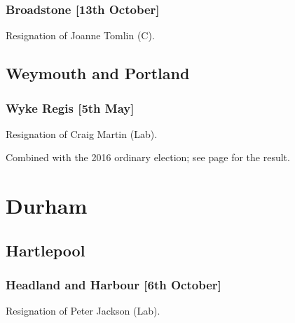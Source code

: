 \documentclass[a4paper,openany]{book}
\begin{document}
\begin{resultsiii}
\subsubsection*{Broadstone \hspace*{\fill}\nolinebreak[1]%
\enspace\hspace*{\fill}
[13th October]}


Resignation of Joanne Tomlin (C).

\subsection*{Weymouth and Portland}

\subsubsection*{Wyke Regis \hspace*{\fill}\nolinebreak[1]%
\enspace\hspace*{\fill}
[5th May]}


Resignation of Craig Martin (Lab).

Combined with the 2016 ordinary election; see page \pageref{WykeRegisWeymouthPortland} for the result.

\section{Durham}

\subsection*{Hartlepool}

\subsubsection*{Headland and Harbour \hspace*{\fill}\nolinebreak[1]%
\enspace\hspace*{\fill}
[6th October]}


Resignation of Peter Jackson (Lab).


\end{resultsiii}
\end{document}
